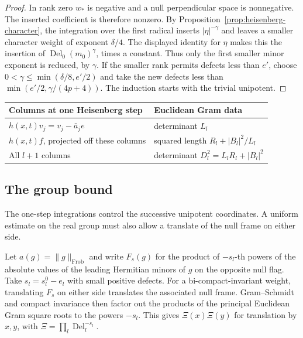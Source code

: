 \begin{proof}
In rank zero \(w_*\) is negative
and a null perpendicular space is nonnegative.
The inserted coefficient is therefore nonzero.
By Proposition~\ref{prop:heisenberg-character}, the integration
over the first radical inserts \(|\eta|^{-\gamma}\) and leaves
a smaller character weight of exponent \(\delta/4\).
The displayed identity for \(\eta\) makes this the insertion
of \(\operatorname{Del}_0(m_0)^\gamma\), times a constant.
Thus only the first smaller minor exponent is reduced, by
\(\gamma\).
If the smaller rank permits defects less than \(e'\),
choose \(0<\gamma\le\min(\delta/8,e'/2)\) and take
the new defects less than \(\min(e'/2,\gamma/(4p+4))\).
The induction starts with the trivial unipotent.

\end{proof}

\begin{construction}
\begin{tabular}{@{}ll@{}}\toprule
Columns at one Heisenberg step & Euclidean Gram data\\\midrule
\(h(x,t)v_j=v_j-\bar a_j e\) & determinant \(L_l\)\\
\(h(x,t)f\), projected off these columns &
squared length \(R_l+|B_l|^2/L_l\)\\
All \(l+1\) columns & determinant \(D_l^2=L_l R_l+|B_l|^2\)\\\bottomrule
\end{tabular}
\caption{Computing one flag minor by orthogonal projection. The rank-one correction to the Gram matrix of the last \(l\) columns contributes the denominator \(L_l\).}\label{fig:heisenberg-gram-minor}
\end{construction}

\subsection{The group bound}

The one-step integrations control the successive unipotent coordinates. A uniform estimate on the real group must also allow a translate of the null frame on either side.

Let \(a(g)=\|g\|_{\mathrm{Frob}}\) and write \(F_s(g)\)
for the product of \(-s_l\)-th powers of the absolute
values of the leading Hermitian minors of \(g\) on the
opposite null flag. Take \(s_l=s_l^0-e_l\) with small
positive defects. For a bi-compact-invariant weight,
translating \(F_s\) on either side translates the
associated null frame. Gram--Schmidt and compact
invariance then factor out the products of the
principal Euclidean Gram square roots to the powers
\(-s_l\). This gives \(\Xi(x)\Xi(y)\) for translation
by \(x,y\), with \(\Xi=\prod_l\operatorname{Del}_l^{-s_l}\).

